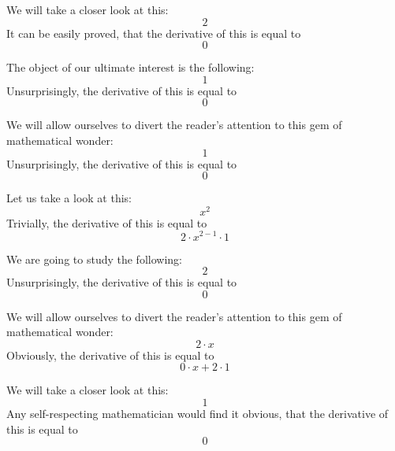\documentclass{article}
\begin{document}
We will take a closer look at this:
\begin{equation}
2 
\end{equation}
It can be easily proved, that the derivative of this is equal to
\begin{equation}
0 
\end{equation}

The object of our ultimate interest is the following:
\begin{equation}
1 
\end{equation}
Unsurprisingly, the derivative of this is equal to
\begin{equation}
0 
\end{equation}

We will allow ourselves to divert the reader's attention to this gem of mathematical wonder:
\begin{equation}
1 
\end{equation}
Unsurprisingly, the derivative of this is equal to
\begin{equation}
0 
\end{equation}

Let us take a look at this:
\begin{equation}
x ^{2 } 
\end{equation}
Trivially, the derivative of this is equal to
\begin{equation}
2 \cdot x ^{2 - 1 } \cdot 1 
\end{equation}

We are going to study the following:
\begin{equation}
2 
\end{equation}
Unsurprisingly, the derivative of this is equal to
\begin{equation}
0 
\end{equation}

We will allow ourselves to divert the reader's attention to this gem of mathematical wonder:
\begin{equation}
2 \cdot x 
\end{equation}
Obviously, the derivative of this is equal to
\begin{equation}
0 \cdot x + 2 \cdot 1 
\end{equation}

We will take a closer look at this:
\begin{equation}
1 
\end{equation}
Any self-respecting mathematician would find it obvious, that the derivative of this is equal to
\begin{equation}
0 
\end{equation}
\end{document}
